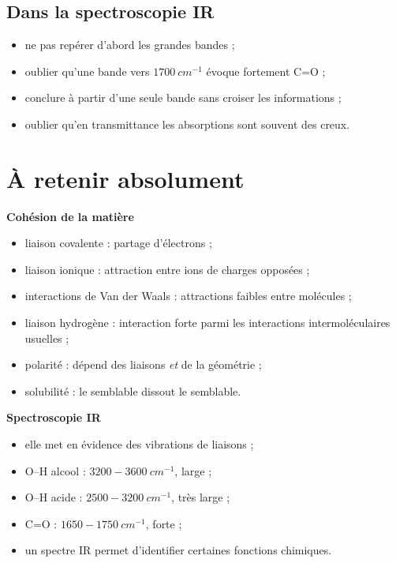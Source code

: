 \documentclass[11pt,a4paper]{article}
\begin{document}
\subsection{Dans la spectroscopie IR}

\begin{itemize}
    \item ne pas repérer d’abord les grandes bandes ;
    \item oublier qu’une bande vers \(1700\ \si{cm^{-1}}\) évoque fortement C=O ;
    \item conclure à partir d’une seule bande sans croiser les informations ;
    \item oublier qu’en transmittance les absorptions sont souvent des creux.
\end{itemize}

\section{À retenir absolument}

\begin{bilanbox}
\textbf{Cohésion de la matière}
\begin{itemize}
    \item liaison covalente : partage d’électrons ;
    \item liaison ionique : attraction entre ions de charges opposées ;
    \item interactions de Van der Waals : attractions faibles entre molécules ;
    \item liaison hydrogène : interaction forte parmi les interactions intermoléculaires usuelles ;
    \item polarité : dépend des liaisons \emph{et} de la géométrie ;
    \item solubilité : le semblable dissout le semblable.
\end{itemize}

\textbf{Spectroscopie IR}
\begin{itemize}
    \item elle met en évidence des vibrations de liaisons ;
    \item O--H alcool : \(3200-3600\ \si{cm^{-1}}\), large ;
    \item O--H acide : \(2500-3200\ \si{cm^{-1}}\), très large ;
    \item C=O : \(1650-1750\ \si{cm^{-1}}\), forte ;
    \item un spectre IR permet d’identifier certaines fonctions chimiques.
\end{itemize}
\end{bilanbox}
\end{document}
